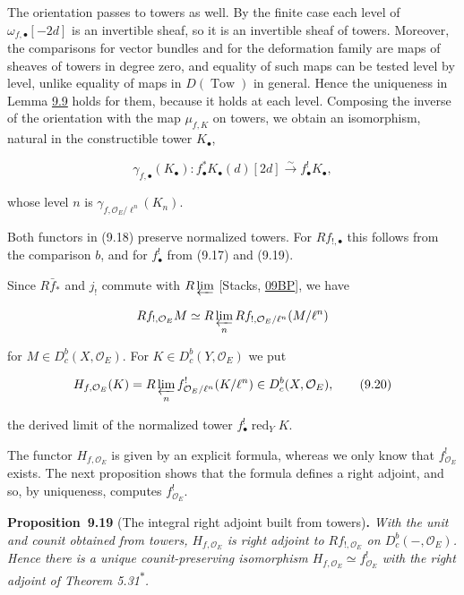 \documentclass[11pt]{article}
\newenvironment{bpstatement}[2]{\par\addvspace{0.6\baselineskip}\noindent\textbf{#1}#2\textbf{.}\enspace\ignorespaces}
  {\par\addvspace{0.4\baselineskip}}
\newenvironment{bpstatementit}[2]{\begin{bpstatement}{#1}{#2}\itshape\ignorespaces}{\end{bpstatement}}
\newcommand{\bpout}[1]{#1\textsuperscript{\hyperlink{bp-outside}{\ensuremath{\ast}}}}
\providecommand{\Dbc}{}\renewcommand{\Dbc}{D^b_c}
\begin{document}
\label{bp60}%
The orientation passes to towers as well. By the finite case each level of \(\omega_{f,\bullet}[-2d]\) is an invertible sheaf, so it is an invertible sheaf of towers. Moreover, the comparisons for vector bundles and for the deformation family are maps of sheaves of towers in degree zero, and equality of such maps can be tested level by level, unlike equality of maps in \(D(\operatorname{Tow})\) in general. Hence the uniqueness in Lemma \hyperref[bp27]{9.9} holds for them, because it holds at each level. Composing the inverse of the orientation with the map \(\mu_{f,K}\) on towers, we obtain an isomorphism, natural in the constructible tower \(K_\bullet\),

\[
\gamma_{f,\bullet}(K_\bullet):f_\bullet^*K_\bullet(d)[2d]\xrightarrow{\sim}f_\bullet^!K_\bullet,
\tag{9.19}
\]

whose level \(n\) is \(\gamma_{f,\mathcal O_E/\ell^n}(K_n)\).

Both functors in (9.18) preserve normalized towers. For \(Rf_{!,\bullet}\) this follows from the comparison \(b\), and for \(f_\bullet^!\) from (9.17) and (9.19).

Since \(R\bar f_*\) and \(j_!\) commute with \(R\varprojlim\) [Stacks, \href{https://stacks.math.columbia.edu/tag/09BP}{09BP}], we have

\[
Rf_{!,\mathcal O_E}M\simeq R\varprojlim_nRf_{!,\mathcal O_E/\ell^n}(M/\ell^n)
\]

for \(M\in\Dbc(X,\mathcal O_E)\). For \(K\in\Dbc(Y,\mathcal O_E)\) we put

\[
H_{f,\mathcal O_E}(K)=R\varprojlim_n f_{\mathcal O_E/\ell^n}^!(K/\ell^n)\in\Dbc(X,\mathcal O_E),
\tag{9.20}
\]

the derived limit of the normalized tower \(f_\bullet^!\operatorname{red}_YK\).

The functor \(H_{f,\mathcal O_E}\) is given by an explicit formula, whereas we only know that \(f^!_{\mathcal O_E}\) exists. The next proposition shows that the formula defines a right adjoint, and so, by uniqueness, computes \(f^!_{\mathcal O_E}\).

\label{bp61}%
\begin{bpstatementit}{Proposition~9.19}{ (The integral right adjoint built from towers)}
With the unit and counit obtained from towers, \(H_{f,\mathcal O_E}\) is right adjoint to \(Rf_{!,\mathcal O_E}\) on \(\Dbc(-,\mathcal O_E)\). Hence there is a unique counit-preserving isomorphism \(H_{f,\mathcal O_E}\simeq f^!_{\mathcal O_E}\) with the right adjoint of Theorem \bpout{5.31}.
\end{bpstatementit}
\end{document}
